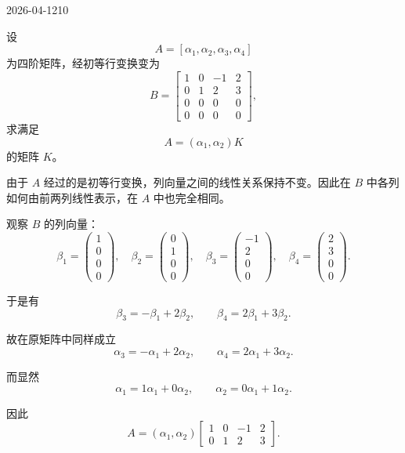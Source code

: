 \begin{mistake}{2026-04-12}{10}

\begin{problemcontent}
设
\[
A=[\alpha_1,\alpha_2,\alpha_3,\alpha_4]
\]
为四阶矩阵，经初等行变换变为
\[
B=\begin{bmatrix}
1&0&-1&2\\
0&1&2&3\\
0&0&0&0\\
0&0&0&0
\end{bmatrix},
\]
求满足
\[
A=(\alpha_1,\alpha_2)K
\]
的矩阵 \(K\)。

\end{problemcontent}

\begin{solutioncontent}
由于 \(A\) 经过的是初等行变换，列向量之间的线性关系保持不变。因此在 \(B\) 中各列如何由前两列线性表示，在 \(A\) 中也完全相同。

观察 \(B\) 的列向量：
\[
\beta_1=\begin{pmatrix}1\\0\\0\\0\end{pmatrix},
\quad
\beta_2=\begin{pmatrix}0\\1\\0\\0\end{pmatrix},
\quad
\beta_3=\begin{pmatrix}-1\\2\\0\\0\end{pmatrix},
\quad
\beta_4=\begin{pmatrix}2\\3\\0\\0\end{pmatrix}.
\]

于是有
\[
\beta_3=-\beta_1+2\beta_2,
\qquad
\beta_4=2\beta_1+3\beta_2.
\]

故在原矩阵中同样成立
\[
\alpha_3=-\alpha_1+2\alpha_2,
\qquad
\alpha_4=2\alpha_1+3\alpha_2.
\]

而显然
\[
\alpha_1=1\alpha_1+0\alpha_2,
\qquad
\alpha_2=0\alpha_1+1\alpha_2.
\]

因此
\[
A=(\alpha_1,\alpha_2)
\begin{bmatrix}
1&0&-1&2\\
0&1&2&3
\end{bmatrix}.
\]


\end{solutioncontent}
\end{mistake}
